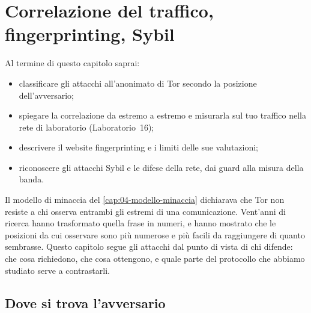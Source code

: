 \chapter{Correlazione del traffico, fingerprinting, Sybil}\label{cap:26-attacchi}

\begin{obiettivi}
Al termine di questo capitolo saprai:
\begin{itemize}[nosep]
  \item classificare gli attacchi all'anonimato di Tor secondo la posizione dell'avversario;
  \item spiegare la correlazione da estremo a estremo e misurarla sul tuo traffico nella rete di laboratorio (Laboratorio~16);
  \item descrivere il website fingerprinting e i limiti delle sue valutazioni;
  \item riconoscere gli attacchi Sybil e le difese della rete, dai guard alla misura della banda.
\end{itemize}
\end{obiettivi}

Il modello di minaccia del \cref{cap:04-modello-minaccia} dichiarava che Tor non resiste a chi osserva entrambi gli estremi di una comunicazione. Vent'anni di ricerca hanno trasformato quella frase in numeri, e hanno mostrato che le posizioni da cui osservare sono più numerose e più facili da raggiungere di quanto sembrasse. Questo capitolo segue gli attacchi dal punto di vista di chi difende: che cosa richiedono, che cosa ottengono, e quale parte del protocollo che abbiamo studiato serve a contrastarli.

\section{Dove si trova l'avversario}\label{sec:att-posizioni}


